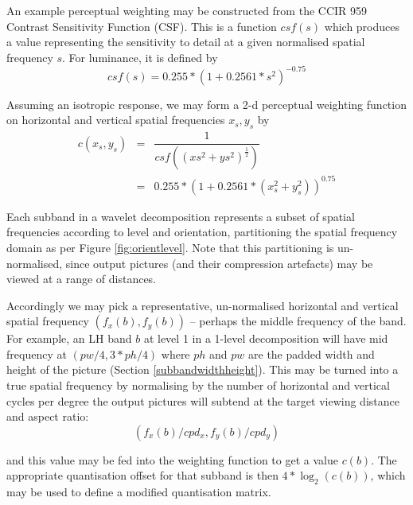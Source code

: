 \begin{informative*}
An example perceptual weighting may be constructed from the CCIR 959 Contrast Sensitivity
Function (CSF). This is a function $csf(s)$ which produces a value representing the
sensitivity to detail at a given normalised spatial frequency $s$. For luminance, it is defined
by 
\[csf(s)=0.255*(1+0.2561*s^2)^{-0.75}\]

Assuming an isotropic response, we may form a 2-d perceptual weighting function on 
horizontal and vertical spatial frequencies $x_s,y_s$ by
\begin{eqnarray*}
c(x_s,y_s) & = & \dfrac{1}{csf((xs^2+ys^2)^{\frac{1}{2}})} \\
& = & 0.255*(1+0.2561*(x_s^2+y_s^2))^{0.75}
\end{eqnarray*}

Each subband in a wavelet decomposition represents a subset of spatial frequencies according
to level and orientation, partitioning the spatial frequency domain as per Figure \ref{fig:orientlevel}.
Note that this partitioning is un-normalised, since output pictures (and their compression artefacts) may
be viewed at a range of distances. 

Accordingly we may pick a representative, un-normalised horizontal and vertical spatial frequency $(f_x(b),f_y(b))$ -- perhaps the middle frequency of the band. For example, an LH band $b$ at level 1 in a 1-level 
decomposition will have mid frequency at $(pw/4,3*ph/4)$ where $ph$ and $pw$ are the padded
width and height of the picture (Section \ref{subbandwidthheight}). This may be turned into a true
spatial frequency by normalising by the number of horizontal and vertical cycles per degree the output
pictures will subtend at the target viewing distance and aspect ratio:
\[ (f_x(b)/cpd_x,f_y(b)/cpd_y)\]

and this value may be fed into the weighting function to get a value $c(b)$. The appropriate
quantisation offset for that subband is then $4*\log_2(c(b))$, which may be used to define a modified
quantisation matrix.

\end{informative*}
